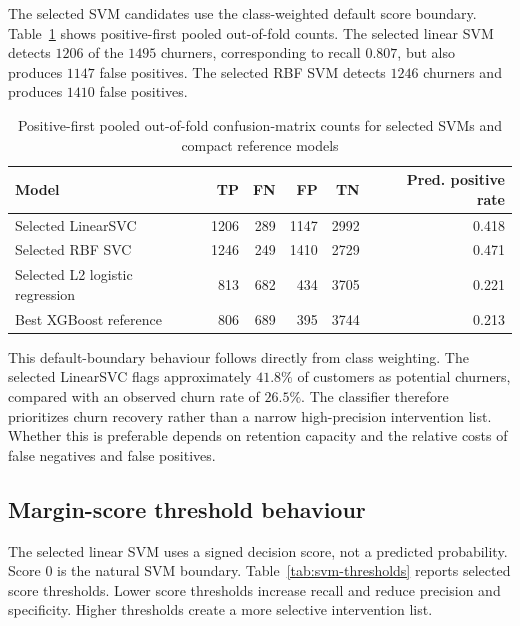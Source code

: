 The selected SVM candidates use the class-weighted default score boundary. Table~\ref{tab:svm-confusion} shows positive-first pooled out-of-fold counts. The selected linear SVM detects \(1206\) of the \(1495\) churners, corresponding to recall \(0.807\), but also produces \(1147\) false positives. The selected RBF SVM detects \(1246\) churners and produces \(1410\) false positives.

\begin{table}[H]
\centering
\small
\begin{tabular}{lrrrrr}
\toprule
Model & TP & FN & FP & TN & Pred. positive rate \\
\midrule
Selected LinearSVC & 1206 & 289 & 1147 & 2992 & 0.418 \\
Selected RBF SVC & 1246 & 249 & 1410 & 2729 & 0.471 \\
Selected L2 logistic regression & 813 & 682 & 434 & 3705 & 0.221 \\
Best XGBoost reference & 806 & 689 & 395 & 3744 & 0.213 \\
\bottomrule
\end{tabular}
\caption{Positive-first pooled out-of-fold confusion-matrix counts for selected SVMs and compact reference models}
\label{tab:svm-confusion}
\end{table}

This default-boundary behaviour follows directly from class weighting. The selected LinearSVC flags approximately \(41.8\%\) of customers as potential churners, compared with an observed churn rate of \(26.5\%\). The classifier therefore prioritizes churn recovery rather than a narrow high-precision intervention list. Whether this is preferable depends on retention capacity and the relative costs of false negatives and false positives.

\subsection{Margin-score threshold behaviour}

The selected linear SVM uses a signed decision score, not a predicted probability. Score \(0\) is the natural SVM boundary. Table~\ref{tab:svm-thresholds} reports selected score thresholds. Lower score thresholds increase recall and reduce precision and specificity. Higher thresholds create a more selective intervention list.


